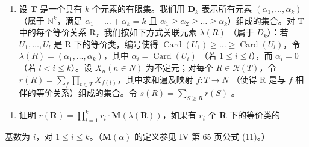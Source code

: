 \begin{enumerate}
\def\labelenumi{\arabic{enumi})}
\setcounter{enumi}{14}
\tightlist
\item
  设 \(\mathbf{T}\) 是一个具有 \(k\) 个元素的有限集。我们用 \(\mathbf{D}_k\) 表示所有元素 \((\alpha_1, \ldots, \alpha_k)\)（属于 \(\mathbb{N}^k\)，满足 \(\alpha_1 + \ldots + \alpha_k = k\) 且 \(\alpha_1 \geqslant \alpha_2 \geqslant \ldots \geqslant \alpha_k\)）组成的集合。对 T 中的每个等价关系 R，我们按如下方式关联元素 \(\lambda(R)\) （属于 \(D_k\)）：若 \(U_1, \ldots, U_l\) 是 R 下的等价类，编号使得 \(\operatorname{Card}(U_1) \geqslant \ldots \geqslant \operatorname{Card}(U_l)\)，令 \(\lambda(R) = (\alpha_1, \ldots, \alpha_k)\)，其中 \(\alpha_i = \operatorname{Card}(U_i)\) （若 \(1 \leqslant i \leqslant l\)），而 \(\alpha_i = 0\) （若 \(l < i \leqslant k\)）。设 \(X_n (n \in N)\) 为不定元；对每个 \(R \in \mathcal{R}(T)\)，令 \(r(R) = \sum_{f} \prod_{t \in T} X_{f(t)}\)，其中求和遍及映射 \(f: T \to N\) （使得 R 是与 \(f\) 相伴的等价关系）组成的集合。令 \(s(R) = \sum_{S \geqslant R} r(S)\) 。
\end{enumerate}

\begin{enumerate}
\def\labelenumi{\alph{enumi})}
\tightlist
\item
  证明 \(r(\mathbf{R}) = \prod_{i=1}^{k} r_i \cdot \mathbf{M}(\lambda(\mathbf{R}))\)，如果有 \(r_i\) 个 \(\mathbf{R}\) 下的等价类的
\end{enumerate}

基数为 \(i\)，对 \(1 \leqslant i \leqslant k\)。（\(\mathbf{M}(\alpha)\) 的定义参见 IV 第 65 页公式 (11)。）

